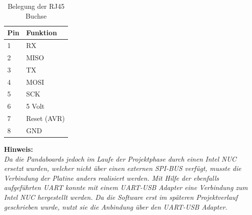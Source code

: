 \begin{table}[H]
  \centering
  \begin{tabularx}{\textwidth}{|l|X|}
    \hline
     Pin & Funktion  \\ \hline \hline
     1 & RX \\ \hline
     2 & MISO \\ \hline
     3 & TX \\ \hline
     4 & MOSI \\ \hline
     5 & SCK \\ \hline
     6 & 5 Volt \\ \hline
     7 & Reset (AVR) \\ \hline
     8 & GND \\ \hline
  \end{tabularx}
  \caption{Belegung der RJ45 Buchse}%
  \label{tab:rj45}
\end{table}

\begin{minipage}{0.9\textwidth}
\textbf{Hinweis:\\}
\emph{Da die Pandaboards jedoch im Laufe der Projektphase durch einen Intel NUC ersetzt wurden, welcher nicht über einen externen SPI-BUS verfügt, musste die Verbindung der Platine anders realisiert werden. 
Mit Hilfe der ebenfalls aufgeführten UART konnte mit einem UART-USB Adapter eine
Verbindung zum Intel NUC hergestellt werden. Da die Software erst im späteren Projektverlauf geschrieben wurde, nutzt sie die Anbindung über 
den UART-USB Adapter.}
\end{minipage}

